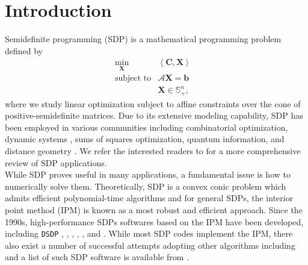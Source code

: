\section{Introduction}

Semidefinite programming (SDP) is a mathematical programming problem defined
by
\begin{eqnarray}
  \min_{\mathbf{X}} & \left\langle \mathbf{C}, \mathbf{X} \right\rangle & \nonumber \\
  \text{subject to} & \mathcal{A} \mathbf{X} = \mathbf{b} & \\ 
  & \mathbf{X} \in \mathbb{S}_+^n, & \nonumber
\end{eqnarray}
where we study linear optimization subject to affine constraints over the cone of
positive-semidefinite matrices. Due to its extensive modeling capability, SDP
has been employed in various communities including combinatorial
optimization{\cite{goemans1995improved, laurent2005semidefinite}},
dynamic systems {\cite{vandenberghe1996semidefinite}}, sums of squares
optimization{\cite{laurent2009sums}}, quantum
information{\cite{hayashi2016quantum}}, and distance geometry
{\cite{biswas2004semidefinite, so2007theory}}. We refer the interested
readers to {\cite{wolkowicz2005semidefinite}} for a more comprehensive review
of SDP applications. \\

While SDP proves useful in many applications, a fundamental issue is how to
numerically solve them. Theoretically, SDP is a convex conic problem which
admits efficient polynomial-time algorithms and for general SDPs, the interior
point method (IPM) is known as a most robust and efficient approach. Since the
1990s, high-performance SDPs softwares based on the IPM have been developed,
including {{\texttt{DSDP}}} {\cite{benson2008algorithm}}, 
{\cite{copt}},  {\cite{aps2019mosek}}, 
{\cite{polik2007sedumi}},  {\cite{toh2012implementation}},
 {\cite{borchers2006csdp}} and 
{\cite{yamashita2012latest}}. While most SDP codes implement the IPM, there also exist
a number of successful attempts adopting other algorithms including
{\cite{kocvara2006pensdp, kwasniewiczimplementation, yang2015sdpnal}}
and a list of such SDP software is available from {\cite{majumdar2020recent}}.\\

